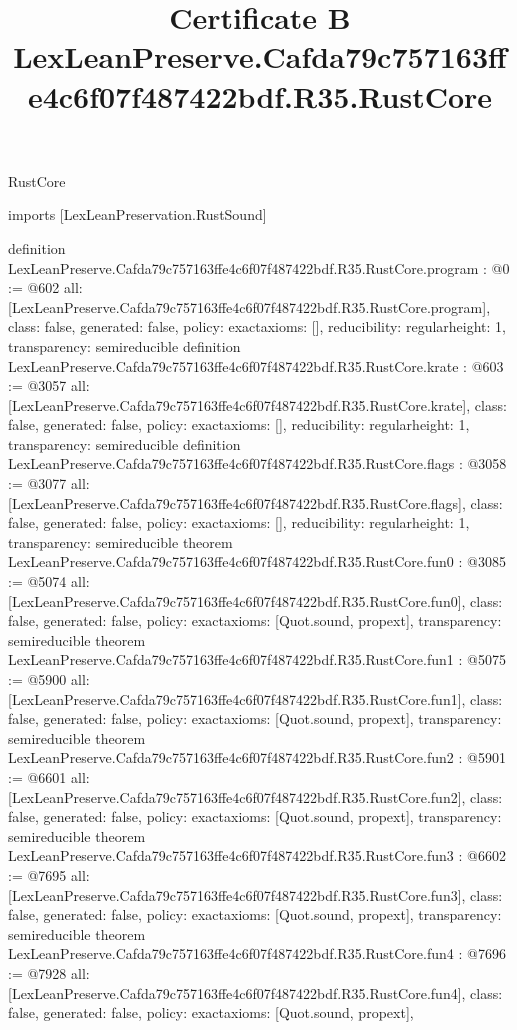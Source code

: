 \begin{lexlean}{RustCore}
\title{Certificate B LexLeanPreserve.Cafda79c757163ffe4c6f07f487422bdf.R35.RustCore}
\begin{coremodule}
imports [LexLeanPreservation.RustSound]

definition LexLeanPreserve.Cafda79c757163ffe4c6f07f487422bdf.R35.RustCore.program : @0 := @602 {
  all: [LexLeanPreserve.Cafda79c757163ffe4c6f07f487422bdf.R35.RustCore.program],
  class: false,
  generated: false,
  policy: exact{axioms: []},
  reducibility: regular{height: 1},
  transparency: semireducible
}
definition LexLeanPreserve.Cafda79c757163ffe4c6f07f487422bdf.R35.RustCore.krate : @603 := @3057 {
  all: [LexLeanPreserve.Cafda79c757163ffe4c6f07f487422bdf.R35.RustCore.krate],
  class: false,
  generated: false,
  policy: exact{axioms: []},
  reducibility: regular{height: 1},
  transparency: semireducible
}
definition LexLeanPreserve.Cafda79c757163ffe4c6f07f487422bdf.R35.RustCore.flags : @3058 := @3077 {
  all: [LexLeanPreserve.Cafda79c757163ffe4c6f07f487422bdf.R35.RustCore.flags],
  class: false,
  generated: false,
  policy: exact{axioms: []},
  reducibility: regular{height: 1},
  transparency: semireducible
}
theorem LexLeanPreserve.Cafda79c757163ffe4c6f07f487422bdf.R35.RustCore.fun0 : @3085 := @5074 {
  all: [LexLeanPreserve.Cafda79c757163ffe4c6f07f487422bdf.R35.RustCore.fun0],
  class: false,
  generated: false,
  policy: exact{axioms: [Quot.sound, propext]},
  transparency: semireducible
}
theorem LexLeanPreserve.Cafda79c757163ffe4c6f07f487422bdf.R35.RustCore.fun1 : @5075 := @5900 {
  all: [LexLeanPreserve.Cafda79c757163ffe4c6f07f487422bdf.R35.RustCore.fun1],
  class: false,
  generated: false,
  policy: exact{axioms: [Quot.sound, propext]},
  transparency: semireducible
}
theorem LexLeanPreserve.Cafda79c757163ffe4c6f07f487422bdf.R35.RustCore.fun2 : @5901 := @6601 {
  all: [LexLeanPreserve.Cafda79c757163ffe4c6f07f487422bdf.R35.RustCore.fun2],
  class: false,
  generated: false,
  policy: exact{axioms: [Quot.sound, propext]},
  transparency: semireducible
}
theorem LexLeanPreserve.Cafda79c757163ffe4c6f07f487422bdf.R35.RustCore.fun3 : @6602 := @7695 {
  all: [LexLeanPreserve.Cafda79c757163ffe4c6f07f487422bdf.R35.RustCore.fun3],
  class: false,
  generated: false,
  policy: exact{axioms: [Quot.sound, propext]},
  transparency: semireducible
}
theorem LexLeanPreserve.Cafda79c757163ffe4c6f07f487422bdf.R35.RustCore.fun4 : @7696 := @7928 {
  all: [LexLeanPreserve.Cafda79c757163ffe4c6f07f487422bdf.R35.RustCore.fun4],
  class: false,
  generated: false,
  policy: exact{axioms: [Quot.sound, propext]},
}
\end{coremodule}
\end{lexlean}
